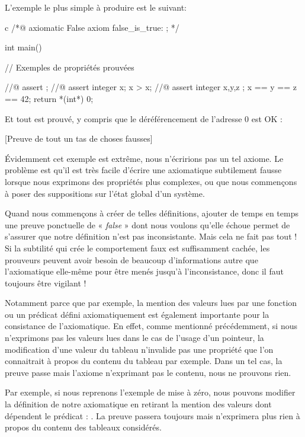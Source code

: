 \documentclass[middle]{zmdocument}
\begin{document}
L'exemple le plus simple à produire est le suivant:



\begin{CodeBlock}{c}
/*@
  axiomatic False{
    axiom false_is_true: \false;
  }
*/

int main(){
  // Exemples de propriétés prouvées

  //@ assert \false;
  //@ assert \forall integer x; x > x;
  //@ assert \forall integer x,y,z ; x == y == z == 42;
  return *(int*) 0;
}
\end{CodeBlock}



Et tout est prouvé, y compris que le déréférencement de l'adresse 0 est OK :



[Preuve de tout un tas de choses fausses]


Évidemment cet exemple est extrême, nous n'écririons pas un tel axiome. Le
problème est qu'il est très facile d'écrire une axiomatique subtilement fausse
lorsque nous exprimons des propriétés plus complexes, ou que nous commençons à
poser des suppositions sur l'état global d'un système.



Quand nous commençons à créer de telles définitions, ajouter de temps en 
temps une preuve ponctuelle de « \textit{false} » dont nous voulons qu'elle échoue permet 
de s'assurer que notre définition n'est pas inconsistante. Mais cela ne fait pas 
tout ! Si la subtilité qui crée le comportement faux est suffisamment cachée, les
prouveurs peuvent avoir besoin de beaucoup d'informations autre que l'axiomatique
elle-même pour être menés jusqu'à l'inconsistance, donc il faut toujours être 
vigilant !



Notamment parce que par exemple, la mention des valeurs lues par une fonction
ou un prédicat défini axiomatiquement est également importante pour la 
consistance de l'axiomatique. En effet, comme mentionné précédemment, si nous
n'exprimons pas les valeurs lues dans le cas de l'usage d'un pointeur, la 
modification d'une valeur du tableau n'invalide pas une propriété que l'on 
connaitrait à propos du contenu du tableau par exemple. Dans un tel cas, la 
preuve passe mais l'axiome n'exprimant pas le contenu, nous ne prouvons rien.



Par exemple, si nous reprenons l'exemple de mise à zéro, nous pouvons modifier
la définition de notre axiomatique en retirant la mention des valeurs dont 
dépendent le prédicat : . La preuve passera toujours
mais n'exprimera plus rien à propos du contenu des tableaux considérés.
\end{document}

